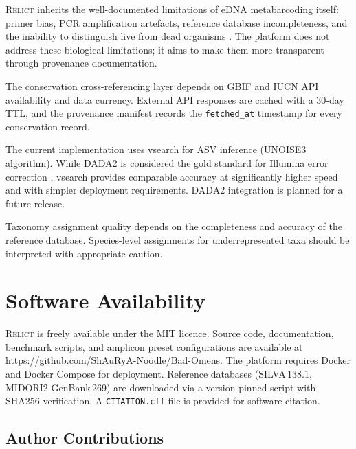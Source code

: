 \documentclass[11pt, a4paper]{article}
\newcommand{\relict}{\textsc{Relict}}
\begin{document}
\relict{} inherits the well-documented limitations of eDNA
metabarcoding itself: primer bias, PCR amplification artefacts,
reference database incompleteness, and the inability to distinguish
live from dead organisms \citep{Taberlet2012}. The platform does not
address these biological limitations; it aims to make them more
transparent through provenance documentation.

The conservation cross-referencing layer depends on GBIF and IUCN API
availability and data currency. External API responses are cached
with a 30-day TTL, and the provenance manifest records the
\texttt{fetched\_at} timestamp for every conservation record.

The current implementation uses vsearch for ASV inference (UNOISE3
algorithm). While DADA2 is considered the gold standard for Illumina
error correction \citep{Callahan2016}, vsearch provides comparable
accuracy at significantly higher speed and with simpler deployment
requirements. DADA2 integration is planned for a future release.

Taxonomy assignment quality depends on the completeness and accuracy
of the reference database. Species-level assignments for
underrepresented taxa should be interpreted with appropriate caution.


\section{Software Availability}

\relict{} is freely available under the MIT licence. Source code,
documentation, benchmark scripts, and amplicon preset configurations
are available at
\url{https://github.com/ShAuRyA-Noodle/Bad-Omens}. The platform
requires Docker and Docker Compose for deployment. Reference
databases (SILVA\,138.1, MIDORI2 GenBank\,269) are downloaded via a
version-pinned script with SHA256 verification. A
\texttt{CITATION.cff} file is provided for software citation.


\subsection*{Author Contributions}
\end{document}
